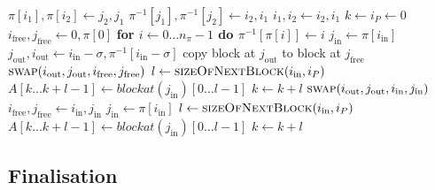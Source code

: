 \documentclass[nolineno,a4paper,UKenglish,cleveref, autoref, thm-restate]{socg-lipics-v2021}
\def\blockat{\textit{blockat}}
\begin{document}
\begin{algorithm}[t]
\caption{restoration of the contents of $A$} \label{alg:finalize}
\begin{algorithmic}[1]
  \State$\pi[i_1],\pi[i_2]\gets j_2,j_1$
  \State$\pi^{-1}[j_1],\pi^{-1}[j_2]\gets i_2,i_1$
  \State$i_1,i_2\gets i_2,i_1$
\EndProcedure
{}
\State$k\gets i_P\gets0$
\State$i_{\mathrm{free}},j_{\mathrm{free}}\gets0,\pi[0]$
\State\textbf{for $i\gets 0\dots n_\pi-1$ do $\pi^{-1}[\pi[i]]\gets i$}
 \State$j_{\mathrm{in}}\gets\pi[i_{\mathrm{in}}]$
 \State$j_{\mathrm{out}},i_{\mathrm{out}}\gets i_{\mathrm{in}}-\sigma,\pi^{-1}[i_{\mathrm{in}}-\sigma]$
  \State copy block at $j_{\mathrm{out}}$ to block at $j_{\mathrm{free}}$
  \State$\Call{swap}{i_{\mathrm{out}},j_{\mathrm{out}},i_{\mathrm{free}},j_{\mathrm{free}}}$
 \EndIf
 \State$l\gets\Call{sizeOfNextBlock}{i_{\mathrm{in}},i_P}$
 \State$A[k\ldots k+l-1]\gets\blockat(j_{\mathrm{in}})[0\ldots l-1]$
 \State$k\gets k+l$
  \State$\Call{swap}{i_{\mathrm{out}},j_{\mathrm{out}},i_{\mathrm{in}},j_{\mathrm{in}}}$
   \State$i_{\mathrm{free}},j_{\mathrm{free}}\gets i_{\mathrm{in}},j_{\mathrm{in}}$
 \EndIf
\EndFor
{}
 \State$j_{\mathrm{in}}\gets\pi[i_{\mathrm{in}}]$
 \State$l\gets\Call{sizeOfNextBlock}{i_{\mathrm{in}},i_P}$
 \State$A[k\ldots k+l-1]\gets\blockat(j_{\mathrm{in}})[0\ldots l-1]$
 \State$k\gets k+l$
\EndFor
\EndProcedure
\end{algorithmic}
\end{algorithm}

\subsection{Finalisation}
\end{document}
